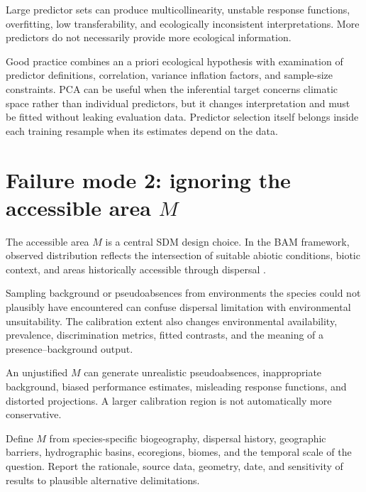 \begin{sdmwarningbox}
Large predictor sets can produce multicollinearity, unstable response functions, overfitting, low transferability, and ecologically inconsistent interpretations. More predictors do not necessarily provide more ecological information.
\end{sdmwarningbox}

Good practice combines an a priori ecological hypothesis with examination of predictor definitions, correlation, variance inflation factors, and sample-size constraints. PCA can be useful when the inferential target concerns climatic space rather than individual predictors, but it changes interpretation and must be fitted without leaking evaluation data. Predictor selection itself belongs inside each training resample when its estimates depend on the data.

\section{Failure mode 2: ignoring the accessible area \texorpdfstring{\(M\)}{M}}

The accessible area \(M\) is a central SDM design choice. In the BAM framework, observed distribution reflects the intersection of suitable abiotic conditions, biotic context, and areas historically accessible through dispersal \parencite{soberon2005interpretation,soberon2009niches,barve2011crucial}.

Sampling background or pseudoabsences from environments the species could not plausibly have encountered can confuse dispersal limitation with environmental unsuitability. The calibration extent also changes environmental availability, prevalence, discrimination metrics, fitted contrasts, and the meaning of a presence--background output.

\begin{sdmwarningbox}
An unjustified \(M\) can generate unrealistic pseudoabsences, inappropriate background, biased performance estimates, misleading response functions, and distorted projections. A larger calibration region is not automatically more conservative.
\end{sdmwarningbox}

Define \(M\) from species-specific biogeography, dispersal history, geographic barriers, hydrographic basins, ecoregions, biomes, and the temporal scale of the question. Report the rationale, source data, geometry, date, and sensitivity of results to plausible alternative delimitations.

